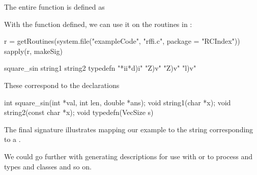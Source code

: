 The entire  function is defined as

With the function defined, we can use it on
the routines in  :
\begin{RCode}
r = getRoutines(system.file("exampleCode", "rffi.c", package = "RCIndex"))
sapply(r, makeSig)
\end{RCode}
\begin{ROutput}
square_sin    string1    string2   typedefn 
 "*ii*d)i"      "Z)v"      "Z)v"      "l)v" 
\end{ROutput}
These correspond to the declarations
\begin{CCode}
int square_sin(int *val, int len, double *ans);
void string1(char *x);
void string2(const char *x);
void typedefn(VecSize s)
\end{CCode}
The final signature illustrates mapping our
 example to the   string 
corresponding to a .


We could go further with generating descriptions for use with
 or  to process  and
 types and \Cpp{} classes and so on.

